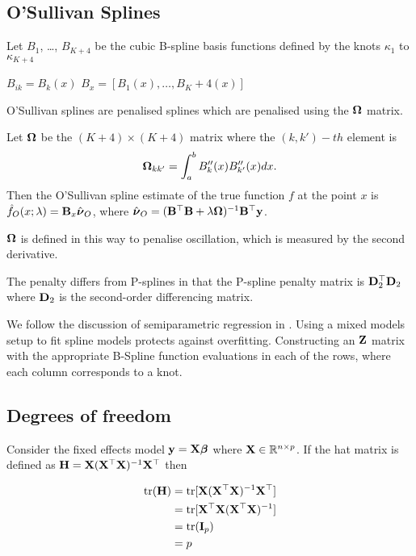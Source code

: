 \documentclass{amsart}[12pt]
\begin{document}
\subsection{O'Sullivan Splines}

Let $B_1$, \ldots, $B_{K+4}$ be the cubic B-spline basis functions defined by the knots $\kappa_1$ to
$\kappa_{K+4}$

$B_{ik} = B_k (x)$
$B_x = [B_1(x), \ldots, B_K+4(x)]$

O'Sullivan splines are penalised splines which are penalised using the ${\boldsymbol \Omega}$ matrix.

Let ${\boldsymbol \Omega}$ be the $(K+4) \times (K+4)$ matrix where the $(k, k')-th$ element is
\[
	{\boldsymbol \Omega}_{k k'} = \int_a^b B''_k(x) B''_{k'}(x) dx.
\]
Then the O'Sullivan spline estimate of the true function $f$ at the point $x$ is
$\hat{f}_O(x; \lambda) = {\bf B}_x \hat{{\boldsymbol \nu}}_O$, where
$\hat{{\boldsymbol \nu}}_O = ({\bf B}^\top {\bf B} + \lambda {\boldsymbol\Omega})^{-1} {\bf B}^\top {\bf y}$.

${\boldsymbol \Omega}$ is defined in this way to penalise oscillation, which is measured by the second derivative.

The penalty differs from P-splines in that the P-spline penalty matrix is ${\bf D}_2^\top {\bf D}_2$ where ${\bf D}_2$ is
the second-order differencing matrix.

We follow the discussion of semiparametric regression in \cite{RuppertWandCarroll}.
Using a mixed models setup to fit spline models protects against overfitting.
Constructing an ${\bf Z}$ matrix with the appropriate B-Spline function evaluations in each of the rows, where
each column corresponds to a knot.

\subsection{Degrees of freedom}


Consider the fixed effects model ${\bf y} = {\bf X} {\boldsymbol \beta}$ where ${\bf X} \in {\mathbb{R}}^{n \times p}$. If the hat matrix is
defined as ${\bf H} = {\bf X} ({\bf X}^\top{\bf X})^{-1} {\bf X}^\top$ then

\begin{align*}
	\text{tr}({\bf H}) & = \text{tr}[{\bf X}({\bf X}^\top{\bf X})^{-1}{\bf X}^\top]  \\
	         & = \text{tr}[{\bf X}^\top{\bf X} ({\bf X}^\top{\bf X})^{-1}] \\
	         & = \text{tr}({\bf I}_p)                          \\
	         & = p                                   
\end{align*}
\end{document}
